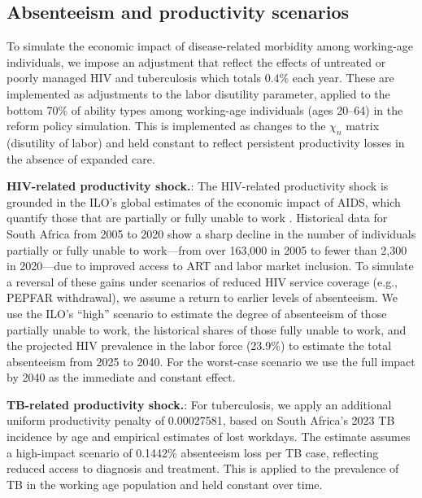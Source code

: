 \documentclass[letterpaper,12pt]{article}
\theoremstyle{definition}
\begin{document}
\begin{spacing}{1.5}
\subsection{Absenteeism and productivity scenarios}
To simulate the economic impact of disease-related morbidity among working-age individuals, we impose an adjustment that reflect the effects of untreated or poorly managed HIV and tuberculosis which totals 0.4\% each year. These are implemented as adjustments to the labor disutility parameter, applied to the bottom 70\% of ability types among working-age individuals (ages 20–64) in the reform policy simulation. This is implemented as changes to the $\chi_n$ matrix (disutility of labor) and held constant to reflect persistent productivity losses in the absence of expanded care.

\textbf{HIV-related productivity shock.}: The HIV-related productivity shock is grounded in the ILO’s global estimates of the economic impact of AIDS, which quantify those that are partially or fully unable to work \citet{ILO2018}. Historical data for South Africa from 2005 to 2020 show a sharp decline in the number of individuals partially or fully unable to work—from over 163,000 in 2005 to fewer than 2,300 in 2020—due to improved access to ART and labor market inclusion. To simulate a reversal of these gains under scenarios of reduced HIV service coverage (e.g., PEPFAR withdrawal), we assume a return to earlier levels of absenteeism. We use the ILO’s “high” scenario to estimate the degree of absenteeism of those partially unable to work, the historical shares of those fully unable to work, and the projected HIV prevalence in the labor force (23.9\%) to estimate the total absenteeism from 2025 to 2040. For the worst-case scenario we use the full impact by 2040 as the immediate and constant effect. 

\textbf{TB-related productivity shock.}: For tuberculosis, we apply an additional uniform productivity penalty of 0.00027581, based on South Africa’s 2023 TB incidence by age and empirical estimates of lost workdays. The estimate assumes a high-impact scenario of 0.1442\% absenteeism loss per TB case, reflecting reduced access to diagnosis and treatment. This is applied to the prevalence of TB in the working age population and held constant over time.




\end{spacing}
\end{document}
